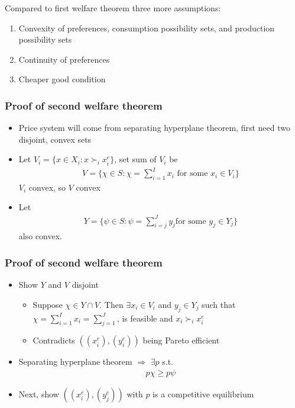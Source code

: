 \documentclass[compress]{beamer}
\newcommand{\pref}{\succ}
\begin{document}
\begin{frame}
  Compared to first welfare theorem three more assumptions:
  \begin{enumerate}
  \item Convexity of preferences, consumption possibility sets, and
    production possibility sets
  \item Continuity of preferences
  \item Cheaper good condition
  \end{enumerate}
\end{frame}

\begin{frame}
  \frametitle{Proof of second welfare theorem}
  \begin{itemize}
  \item Price system will come from separating hyperplane theorem,
    first need two disjoint, convex sets
  \item Let $V_i = \{ x \in X_i : x \pref_i
    x_i^e \}$, set sum of $V_i$ be
    \begin{align*}
      V = \{ \chi \in S: \chi = \sum_{i=1}^I x_i \text{ for some } x_i
      \in V_i \}  
    \end{align*}
    $V_i$ convex, so $V$ convex
  \item Let 
    \begin{align*}
      Y = \{ \psi \in S: \psi = \sum_{i=j}^J y_j \text{
        for some } y_j \in Y_j \}  
    \end{align*}
    also convex.
  \end{itemize}
\end{frame}

\begin{frame}
  \frametitle{Proof of second welfare theorem}
  \begin{itemize}
  \item Show $Y$ and $V$ disjoint
    \begin{itemize}
    \item Suppose $\chi \in Y \cap V$. Then $\exists x_i \in V_i$ and
      $y_j \in Y_j$ such that $\chi = \sum_{i=1}^I x_i =
      \sum_{j=1}^J$, is feasible and $x_i \pref_i x_i^e$
    \item Contradicts $((x_i^e),(y_i^e))$ being Pareto efficient
    \end{itemize}
  \item Separating hyperplane theorem $\Rightarrow$ $\exists p$ s.t.
    \begin{align}
      p \chi \geq p \psi \label{ieq:p}
    \end{align}
  \item Next, show $((x_i^e), (y_j^e))$ with $p$ is a competitive
    equilibrium 
  \end{itemize}
\end{frame}
\end{document}
